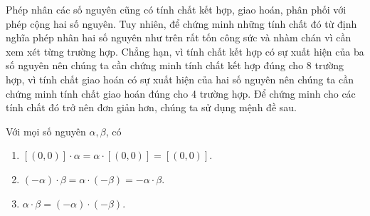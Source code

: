 Phép nhân các số nguyên cũng có tính chất kết hợp, giao hoán, phân phối với phép cộng hai số nguyên. Tuy nhiên, để chứng minh những tính chất đó từ định nghĩa phép nhân hai số nguyên như trên rất tốn công sức và nhàm chán vì cần xem xét từng trường hợp. Chẳng hạn, vì tính chất kết hợp có sự xuất hiện của ba số nguyên nên chúng ta cần chứng minh tính chất kết hợp đúng cho 8 trường hợp, vì tính chất giao hoán có sự xuất hiện của hai số nguyên nên chúng ta cần chứng minh tính chất giao hoán đúng cho 4 trường hợp. Để chứng minh cho các tính chất đó trở nên đơn giản hơn, chúng ta sử dụng mệnh đề sau.
\begin{proposition}\label{proposition:sign}
    Với mọi số nguyên $\alpha, \beta$, có
    \begin{enumerate}[label={(\roman*)}]
        \item $[(0, 0)]\cdot\alpha = \alpha\cdot[(0,0)] = [(0,0)]$.
        \item $(-\alpha)\cdot\beta = \alpha\cdot(-\beta) = -\alpha\cdot\beta$.
        \item $\alpha\cdot\beta = (-\alpha)\cdot(-\beta)$.
    \end{enumerate}
\end{proposition}

